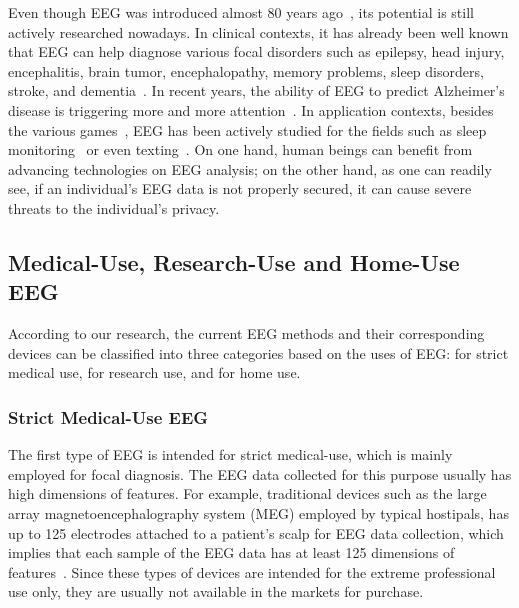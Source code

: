 \indent Even though EEG was introduced almost 80 years ago~\cite{swartz1998advantages}, its potential is still actively researched nowadays. In clinical contexts, it has already been well known that EEG can help diagnose various focal disorders such as epilepsy, head injury, encephalitis, brain tumor, encephalopathy, memory problems, sleep disorders, stroke, and dementia~\cite{eegdiagnosis}. In recent years, the ability of EEG to predict Alzheimer's disease is triggering more and more attention~\cite{dauwels2010diagnosis}. In application contexts, besides the various games~\cite{coyle2011eeg}, EEG has been actively studied for the fields such as sleep monitoring~\cite{nakamura2017automatic} or even texting~\cite{zhang2017converting}. On one hand, human beings can benefit from advancing technologies on EEG analysis; on the other hand, as one can readily see, if an individual's EEG data is not properly secured, it can cause severe threats to the individual's privacy.

\subsection{Medical-Use, Research-Use and Home-Use EEG}
According to our research, the current EEG methods and their corresponding devices can be classified into three categories based on the uses of EEG: for strict medical use, for research use, and for home use.

\subsubsection{Strict Medical-Use EEG}
The first type of EEG is intended for strict medical-use, which is mainly employed for focal diagnosis. The EEG data collected for this purpose usually has high dimensions of features. For example, traditional devices such as the large array magnetoencephalography system (MEG) employed by typical hostipals, has up to 125 electrodes attached to a patient's scalp for EEG data collection, which implies that each sample of the EEG data has at least 125 dimensions of features~\cite{lantz2003epileptic}. Since these types of devices are intended for the extreme professional use only, they are usually not available in the markets for purchase.

